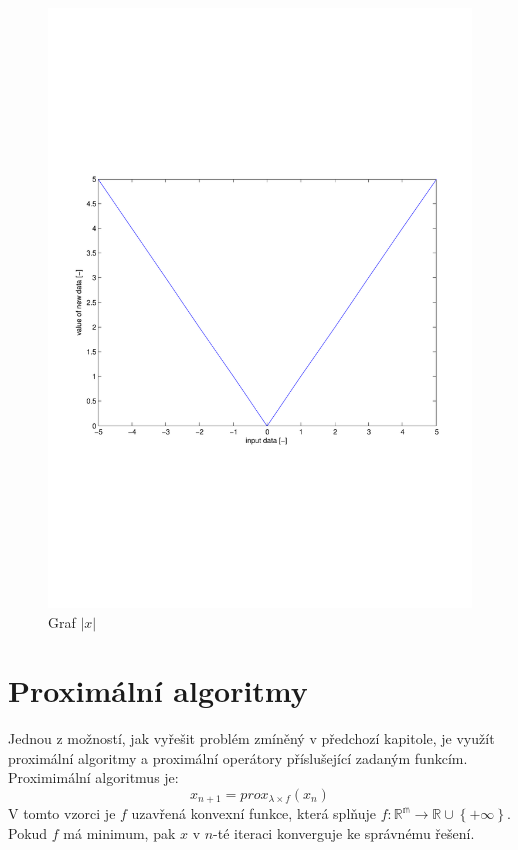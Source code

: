 \documentclass[FM,BP]{tulthesis}
\newcounter{Vzorce}
\begin{document}
\begin{figure}[!h]
\begin{center}
\includegraphics[scale=0.55]{obr/abs.pdf}
\end{center}
\caption{Graf $\left|x\right|$}
\label{fig:abs}
\end{figure}

\chapter{Proximální algoritmy}
Jednou z možností, jak vyřešit problém zmíněný v předchozí kapitole, je využít proximální algoritmy a proximální operátory příslušející zadaným funkcím. Proximimální algoritmus je:
\begin{equation} \label{eq:proxAlg} \tag{Vzorec \theVzorce}
x_{n+1} = prox_{\lambda \times f}(x_{n})
\end{equation}
V tomto vzorci je $f$ uzavřená konvexní funkce, která splňuje $f : \mathbb{R^{m}} \rightarrow \mathbb{R} \cup \left\{+\infty\right\}$. Pokud $f$ má minimum, pak $x$ v $n$-té iteraci konverguje ke správnému řešení.
\end{document}
